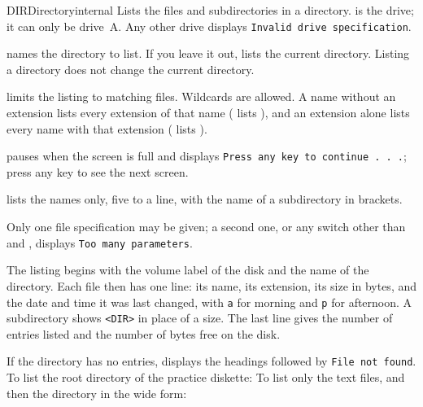 \begin{DosEntry}{DIR}{Directory}{internal}
\Purpose Lists the files and subdirectories in a directory.
\Format {}
\Remarks
{} is the drive; it can only be drive~A.  Any other drive displays
\texttt{Invalid drive specification}.

 names the directory to list.  If you leave it out, 
lists the current directory.  Listing a directory does not change the
current directory.

 limits the listing to matching files.  Wildcards are
allowed.  A name without an extension lists every extension of that name
( lists ), and an extension alone lists every
name with that extension ( lists ).

 pauses when the screen is full and displays
\texttt{Press any key to continue . . .}; press any key to see the next
screen.

 lists the names only, five to a line, with the name of a
subdirectory in brackets.

Only one file specification may be given; a second one, or any switch
other than  and , displays \texttt{Too many parameters}.

The listing begins with the volume label of the disk and the name of the
directory.  Each file then has one line: its name, its extension, its size
in bytes, and the date and time it was last changed, with \texttt{a} for
morning and \texttt{p} for afternoon.  A subdirectory shows
\texttt{<DIR>} in place of a size.  The last line gives the number of
entries listed and the number of bytes free on the disk.

If the directory has no entries,  displays the headings followed
by \texttt{File not found}.
\Example
To list the root directory of the practice diskette:
To list only the text files, and then the directory  in the
wide form:
\end{DosEntry}

